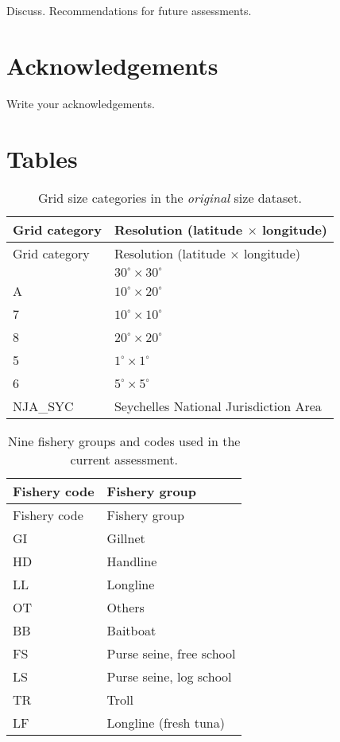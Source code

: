 \documentclass[
]{scrartcl}
\begin{document}
Discuss. Recommendations for future assessments.

\section{Acknowledgements}\label{acknowledgements}

Write your acknowledgements.

\newpage{}

\section{Tables}\label{tables}

\begin{longtable}[]{@{}ll@{}}
\caption{Grid size categories in the \emph{original} size
dataset.}\label{tbl-grid-size}\tabularnewline
\toprule\noalign{}
Grid category & Resolution (latitude \(\times\) longitude) \\
\midrule\noalign{}
\endfirsthead
\toprule\noalign{}
Grid category & Resolution (latitude \(\times\) longitude) \\
\midrule\noalign{}
\endhead
\bottomrule\noalign{}
\endlastfoot
9 & \(30^\circ\times 30^\circ\) \\
A & \(10^\circ\times 20^\circ\) \\
7 & \(10^\circ\times 10^\circ\) \\
8 & \(20^\circ\times 20^\circ\) \\
5 & \(1^\circ\times 1^\circ\) \\
6 & \(5^\circ\times 5^\circ\) \\
NJA\_SYC & Seychelles National Jurisdiction Area \\
\end{longtable}

\newpage{}

\begin{longtable}[]{@{}ll@{}}
\caption{Nine fishery groups and codes used in the current
assessment.}\label{tbl-fishery-codes}\tabularnewline
\toprule\noalign{}
Fishery code & Fishery group \\
\midrule\noalign{}
\endfirsthead
\toprule\noalign{}
Fishery code & Fishery group \\
\midrule\noalign{}
\endhead
\bottomrule\noalign{}
\endlastfoot
GI & Gillnet \\
HD & Handline \\
LL & Longline \\
OT & Others \\
BB & Baitboat \\
FS & Purse seine, free school \\
LS & Purse seine, log school \\
TR & Troll \\
LF & Longline (fresh tuna) \\
\end{longtable}
\end{document}
